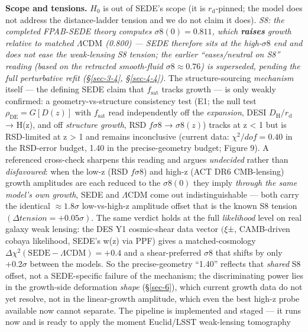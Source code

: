 \documentclass[preprint,12pt]{elsarticle}
\begin{document}
\textbf{Scope and tensions.} \(H_{0}\) is out of SEDE's scope (it is
\(r_{\mathrm{d}}\)-pinned; the model does not address the
distance-ladder tension and we do not claim it does). \emph{S8: the
completed FPAB-SEDE theory computes \(\sigma 8(0) = 0.811\), which
\textbf{raises} growth relative to matched \(\Lambda \mathrm{CDM}\)
(0.800) --- SEDE therefore sits at the high-\(\sigma 8\) end and does
not ease the weak-lensing S8 tension; the earlier ``eases/neutral on
S8'' reading (based on the retracted smooth-fluid
\(\sigma 8 \approx  0.76\)) is superseded, pending the full perturbative
refit (§\ref{sec-3-4}, §\ref{sec-4-4}).} The structure-sourcing
\emph{mechanism} itself --- the defining SEDE claim that
\(f_{\mathrm{sat}}\) tracks growth --- is only weakly confirmed: a
geometry-vs-structure consistency test (E1; the null test
\(\rho _\mathrm{DE} = G[D(z)]\) with \(f_{\mathrm{sat}}\) read
independently off the \emph{expansion}, DESI
\(D_{\mathrm{H}}/r_{\mathrm{d}}\) → H(z), and off \emph{structure
growth}, RSD \(f\sigma 8\) → \(\sigma 8(z)\)) tracks at z \textless{} 1
but is RSD-limited at z \textgreater{} 1 and remains inconclusive
(current data: \(\chi ^{2}/dof = 0.40\) in the RSD-error budget, 1.40 in
the precise-geometry budget; Figure 9). A referenced cross-check
sharpens this reading and argues \emph{undecided} rather than
\emph{disfavoured}: when the low-z (RSD \(f\sigma 8\)) and high-z (ACT
DR6 CMB-lensing) growth amplitudes are each reduced to the
\(\sigma 8(0)\) they imply \emph{through the same model's own growth},
SEDE and \(\Lambda \mathrm{CDM}\) come out indistinguishable --- both
carry the identical \(\approx 1.8\sigma\) low-vs-high-z amplitude offset
that is the known S8 tension \((\Delta tension = +0.05\sigma )\). The
same verdict holds at the full \emph{likelihood} level on real galaxy
weak lensing: the DES Y1 cosmic-shear data vector \((\xi\)±, CAMB-driven
cobaya likelihood, SEDE's w(z) via PPF) gives a matched-cosmology
\(\Delta \chi ^{2}(\mathrm{SEDE} - \Lambda \mathrm{CDM}) = +0.4\) and a
shear-preferred \(\sigma 8\) that shifts by only \(+0.2\sigma\) between
the models. So the precise-geometry ``1.40'' reflects that \emph{shared}
S8 offset, not a SEDE-specific failure of the mechanism; the
discriminating power lies in the growth-side deformation \emph{shape}
(§\ref{sec-6}), which current growth data do not yet resolve, not in the
linear-growth amplitude, which even the best high-z probe available now
cannot separate. The pipeline is implemented and staged --- it runs now
and is ready to apply the moment Euclid/LSST weak-lensing tomography
\end{document}
